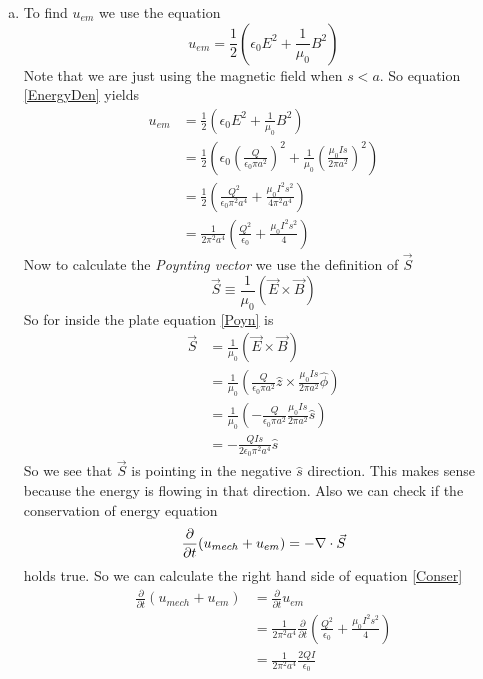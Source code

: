 \documentclass[11pt]{article}
\numberwithin{equation}{section}
\newcommand{\grad}{\bold\nabla}
\begin{document}
\begin{enumerate}[(a)]
\item
To find $u_{em}$ we use the equation
\begin{equation}
u_{em} = \frac{1}{2}\left(\epsilon_0 E^2+\frac{1}{\mu_0}B^2\right)
\label{EnergyDen}
\end{equation}
Note that we are just using the magnetic field when $s<a$. So equation \ref{EnergyDen} yields
\begin{align*}
u_{em} &= \frac{1}{2}\left(\epsilon_0 E^2+\frac{1}{\mu_0}B^2\right)\\
&= \frac{1}{2}\left(\epsilon_0 \left(\frac{Q}{\epsilon_0\pi a^2}\right)^2+\frac{1}{\mu_0}\left(\frac{\mu_0Is}{2\pi a^2}\right)^2\right)\\
&= \frac{1}{2}\left(\frac{Q^2}{\epsilon_0\pi^2 a^4} + \frac{\mu_0I^2s^2}{4\pi^2 a^4}\right)\\
&= \frac{1}{2\pi^2 a^4}\left(\frac{Q^2}{\epsilon_0} + \frac{\mu_0I^2s^2}{4}\right)
\end{align*}
Now to calculate the \emph{Poynting vector} we use the definition of $\vec{S}$ 
\begin{equation}
\vec{S}\equiv\frac{1}{\mu_0}(\vec{E}\times\vec{B})
\label{Poyn}
\end{equation}
So for inside the plate equation \ref{Poyn} is
\begin{align*}
\vec{S} &= \frac{1}{\mu_0}(\vec{E}\times\vec{B})\\
&= \frac{1}{\mu_0}(\frac{Q}{\epsilon_0\pi a^2}\hat{z}\times\frac{\mu_0Is}{2\pi a^2}\hat{\phi})\\
&= \frac{1}{\mu_0}(-\frac{Q}{\epsilon_0\pi a^2}\frac{\mu_0Is}{2\pi a^2}\hat{s})\\
&= -\frac{QIs}{2\epsilon_0\pi^2 a^4}\hat{s}
\end{align*}
So we see that $\vec{S}$ is pointing in the negative $\hat{s}$ direction. This makes sense because the energy is flowing in that direction. Also we can check if the conservation of energy equation
\begin{equation}
\frac{\partial}{\partial t}(u_{mech}+u_{em}) = -\grad\cdot\vec{S}
\label{Conser}
\end{equation}
holds true. So we can calculate the right hand side of equation \ref{Conser}
\begin{align*}
\frac{\partial}{\partial t}(u_{mech}+u_{em}) &= \frac{\partial}{\partial t}u_{em}\\ 
&= \frac{1}{2\pi^2 a^4}\frac{\partial}{\partial t}\left(\frac{Q^2}{\epsilon_0} + \frac{\mu_0I^2s^2}{4}\right)\\
&= \frac{1}{2\pi^2 a^4}\frac{2QI}{\epsilon_0}\\

\end{align*}
\end{enumerate}
\end{document}
